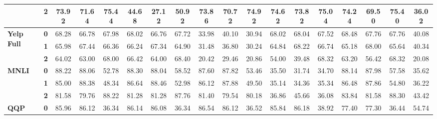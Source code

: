 \begin{sidewaystable*}[h]
\begin{tabular*}{\columnwidth}{l@{\extracolsep{\fill}}lcccccccccccccccc}
                                    & \textbf{2} & 73.92      & 71.64      & 75.44      & 44.68      & 27.12      & 50.92      & 73.86       & 70.72       & 74.92      & 74.62      & 73.82      & 75.04      & 74.24      & 69.50      & 75.40      & 36.02                           \\
				    \hline
\multirow{3}{*}{\textbf{Yelp Full}} & \textbf{0} & 68.28      & 66.78      & 67.98      & 68.02      & 66.76      & 67.72      & 33.98       & 40.10       & 30.94      & 68.02      & 68.04      & 67.52      & 68.48      & 67.76      & 67.76      & 40.08                           \\
                                    & \textbf{1} & 65.98      & 67.44      & 66.36      & 66.24      & 67.34      & 64.90      & 31.48       & 36.80       & 30.24      & 64.84      & 68.22      & 66.74      & 65.18      & 68.00      & 65.64      & 40.34                           \\
                                    & \textbf{2} & 64.02      & 63.00      & 68.00      & 66.42      & 64.00      & 68.40      & 20.42       & 29.46       & 20.86      & 54.00      & 39.48      & 68.32      & 63.20      & 56.42      & 68.32      & 20.08                           \\
				    \hline
\multirow{3}{*}{\textbf{MNLI}}      & \textbf{0} & 88.22      & 88.06      & 52.78      & 88.30      & 88.04      & 58.52      & 87.60       & 87.82       & 53.46      & 35.50      & 31.74      & 34.70      & 88.14      & 87.98      & 57.58      & 35.62                           \\
                                    & \textbf{1} & 85.00      & 88.38      & 48.34      & 86.64      & 88.46      & 52.98      & 86.12       & 87.88       & 49.50      & 35.14      & 34.36      & 35.34      & 86.48      & 87.86      & 54.80      & 36.22                           \\
                                    & \textbf{2} & 81.58      & 79.76      & 88.22      & 81.28      & 81.28      & 87.76      & 81.40       & 79.54       & 80.18      & 36.86      & 45.66      & 36.08      & 83.84      & 81.58      & 88.30      & 43.42                           \\
				    \hline
\multirow{3}{*}{\textbf{QQP}}       & \textbf{0} & 85.96      & 86.12      & 36.34      & 86.14      & 86.08      & 36.34      & 86.54       & 86.12       & 36.52      & 85.84      & 86.18      & 38.92      & 77.40      & 77.30      & 36.44      & 54.74                           \\

\end{tabular*}
\end{sidewaystable*}
